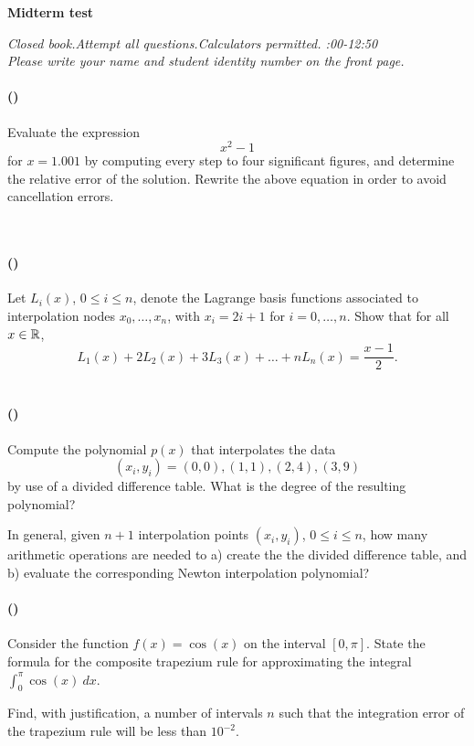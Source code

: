 \documentclass{article}
\newcounter{problems}
\newcommand{\problem}[1]{\paragraph{(\theproblems)}\addtocounter{problems}{1}\label{#1}}
\newcommand{\marks}[2][0mm]{\hspace{30mm}\mbox{}\vskip #1\hspace{-30mm}\hfill{\sf [#2 marks]}\\[-\baselineskip]}
\renewcommand{\marks}[2][0mm]{\hspace{30mm}\mbox{}\vskip #1\hspace{-30mm}\hfill{\sf [#2 marks]}\\[-\baselineskip]}
\begin{document}
 
\begin{center}
{\Large {\bf Midterm test}}
\end{center}

\begin{center} 
\emph{Closed book.\quad Attempt all questions.\quad Calculators permitted. :00-12:50}\\
{\em Please write your name and student identity number on the front page.}
\end{center}

\problem{p0} Evaluate the expression
\begin{equation*}
  x^2-1
\end{equation*}
for $x=1.001$ by computing every step to four significant figures, and determine the relative error of the solution.
Rewrite the above equation in order to avoid cancellation errors. 

\marks[-6mm]{2}

\newpage
\mbox{}
\newpage

\problem{p2} Let $L_i(x)$, $0\leq i\leq n$, denote the Lagrange basis functions associated to interpolation nodes $x_0,\dots,x_n$, with $x_i=2i+1$ for $i=0,\dots,n$. Show that for all $x\in \mathbb{R}$,
\begin{equation*}
  L_1(x)+2L_2(x)+3L_3(x)+\dots +nL_n(x) = \frac{x-1}{2}.
\end{equation*}\marks[-6mm]{2}

\newpage
\mbox{}
\newpage
\problem{p2} 
Compute the polynomial $p(x)$ that  interpolates the data 
\begin{equation*} 
(x_i, y_i)= (0, 0), (1, 1), (2,4), (3,9) 
\end{equation*} 
by use of a divided difference table. What is the degree of the resulting polynomial?

In general, given $n+1$ interpolation points $(x_i,y_i)$, $0\leq i\leq n$, how many arithmetic operations are needed to a) create the the divided difference table, and b) evaluate
the corresponding Newton interpolation polynomial?
\marks{3} 

\newpage
\mbox{}
\newpage

\problem{p3} Consider the function $f(x)=\cos(x)$ on the interval $[0,\pi]$. 
State the formula for the composite trapezium rule for approximating the integral $\int_{0}^{\pi} \cos(x) \ dx$.

Find, with justification, a number of intervals $n$ such that the integration error of the trapezium rule will be less than $10^{-2}$.
\marks{3} 
\end{document}

